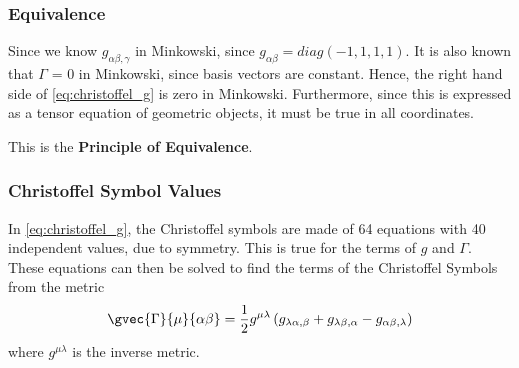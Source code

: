 \subsubsection{Equivalence}
Since we know $g_{\alpha \beta, \gamma}$ in Minkowski, since $g_{\alpha \beta} = diag(-1, 1, 1, 1)$. It is also known that $\Gamma$ = 0 in Minkowski, since basis vectors are constant.  Hence, the right hand side of \vref{eq:christoffel_g} is zero in Minkowski. Furthermore, since this is expressed as a tensor equation of geometric objects, it must be true in all coordinates. \par This is the \textbf{Principle of Equivalence}.
\subsubsection{Christoffel Symbol Values}
In \vref{eq:christoffel_g}, the Christoffel symbols are made of 64 equations with 40 independent values, due to symmetry. This is true for the terms of $g$ and $\Gamma$. These equations can then be solved to find the terms of the Christoffel Symbols from the metric
$$ \gvec{\Gamma}{\mu}{\alpha \beta} = \frac{1}{2}g^{\mu \lambda} \left(g_{\lambda \alpha, \beta} + g_{\lambda \beta, \alpha} - g_{\alpha \beta, \lambda}\right) $$
where $g^{\mu \lambda}$ is the inverse metric.